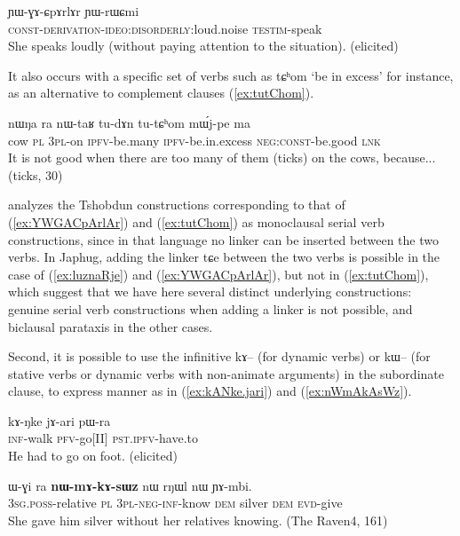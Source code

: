 \documentclass[oldfontcommands,oneside,a4paper,11pt]{article}
\newcommand{\ipa}[1]{{\phon \mbox{#1}}} %
\newcommand{\refb}[1]{(\ref{#1})}
\begin{document}
\begin{exe}
\ex \label{ex:YWGACpArlAr}
\gll
\ipa{ɲɯ-ɣɤ-ɕpɤrlɤr} 	\ipa{ɲɯ-rɯɕmi} \\
\textsc{const-derivation-ideo:disorderly:}loud.noise \textsc{testim}-speak\\
\glt She speaks loudly (without paying attention to the situation). (elicited)
\end{exe}

It also occurs with a specific set of verbs such as \ipa{tɕʰom} `be in excess' for instance, as an alternative to complement clauses \refb{ex:tutChom}.

\begin{exe}
\ex \label{ex:tutChom}
\gll
\ipa{nɯŋa} 	\ipa{ra} 	\ipa{nɯ-taʁ} 	\ipa{tu-dɤn} 	\ipa{tu-tɕʰom} 	\ipa{mɯ́j-pe} 	\ipa{ma} \\
cow \textsc{pl} \textsc{3pl}-on \textsc{ipfv}-be.many \textsc{ipfv}-be.in.excess \textsc{neg:const}-be.good \textsc{lnk} \\
\glt It is not good when there are too many of them (ticks) on the cows, because... (ticks, 30)
\end{exe}

 \citet{sun12complementation} analyzes the  Tshobdun constructions     corresponding to that of \refb{ex:YWGACpArlAr} and \refb{ex:tutChom} as monoclausal serial verb constructions, since in that language no linker can be inserted between the two verbs. In Japhug,   adding the linker \ipa{tɕe} between the two verbs is possible in the case of \refb{ex:luznaRje} and \refb{ex:YWGACpArlAr}, but not in \refb{ex:tutChom}, which suggest that we have here several distinct underlying constructions: genuine serial verb constructions when adding a linker is not possible, and biclausal parataxis in the other cases. 


Second, it is possible to use the infinitive \ipa{kɤ--} (for dynamic verbs) or \ipa{kɯ--} (for stative verbs or dynamic verbs with non-animate arguments) in the subordinate clause, to express manner as in \refb{ex:kANke.jari} and \refb{ex:nWmAkAsWz}.

\begin{exe}
\ex \label{ex:kANke.jari}
\gll
\ipa{kɤ-ŋke} 	\ipa{jɤ-ari} 	\ipa{pɯ-ra} \\
\textsc{inf}-walk \textsc{pfv}-go[II] \textsc{pst.ipfv}-have.to \\
\glt He had to go on foot. (elicited)
\end{exe}

 
\begin{exe}
\ex \label{ex:nWmAkAsWz}
\gll
\ipa{ɯ-ɣi}   	\ipa{ra}   	\ipa{\textbf{nɯ-mɤ-kɤ-sɯz}}   	\ipa{nɯ}   	\ipa{rŋɯl}   	\ipa{nɯ}   	\ipa{ɲɤ-mbi.}   \\
\textsc{3sg.poss}-relative \textsc{pl} \textsc{3pl-neg-inf}-know \textsc{dem} silver \textsc{dem} \textsc{evd}-give \\
\glt  She gave him silver without her relatives knowing. (The Raven4, 161)
\end{exe}
\end{document}
